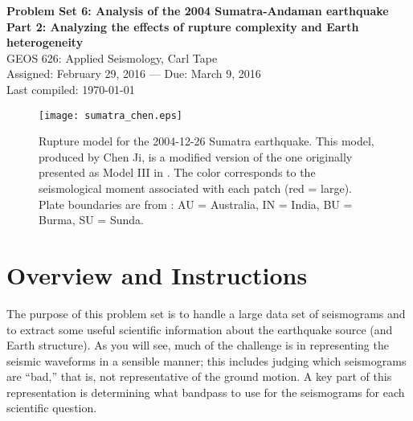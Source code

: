 \documentclass[11pt,titlepage,fleqn]{article}
\begin{document}

\begin{spacing}{1.2} 
\centering
{\large \bf Problem Set 6: Analysis of the 2004 Sumatra-Andaman earthquake \\
Part 2: Analyzing the effects of rupture complexity and Earth heterogeneity } \\
GEOS 626: Applied Seismology, Carl Tape \\
Assigned: February 29, 2016 --- Due: March 9, 2016 \\
Last compiled: \today
\end{spacing}


\begin{figure}[h]
\centering
\texttt{[image: sumatra\_chen.eps]}
\caption[]
{{
Rupture model for the 2004-12-26  Sumatra earthquake.
This model, produced by Chen Ji, is a modified version of the one originally presented as Model III in \citet[][Figure~5c]{Ammon2005}.
The color corresponds to the seismological moment associated with each patch (red = large).
Plate boundaries are from \citet{Bird2003}: AU = Australia, IN = India, BU = Burma, SU = Sunda.
}}
\label{fig:sumatra_chen}
\end{figure}


\clearpage\pagebreak
\section*{Overview and Instructions}

The purpose of this problem set is to handle a large data set of seismograms and to extract some useful scientific information about the earthquake source (and Earth structure). As you will see, much of the challenge is in representing the seismic waveforms in a sensible manner; this includes judging which seismograms are ``bad,'' that is, not representative of the ground motion. A key part of this representation is determining what bandpass to use for the seismograms for each scientific question.
\end{document}
